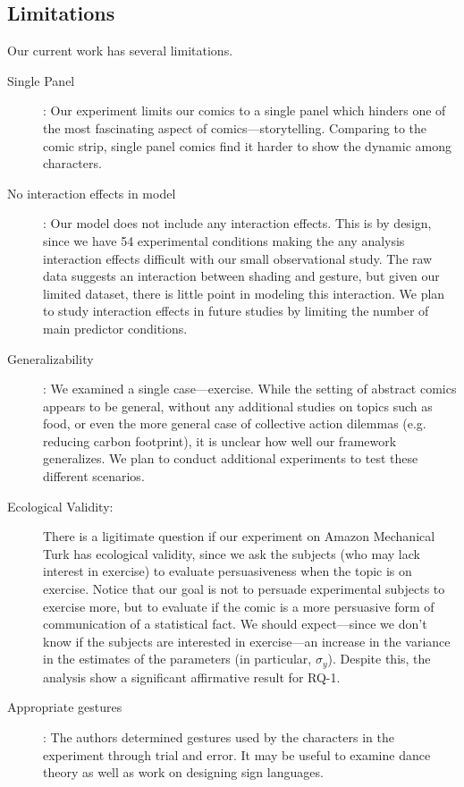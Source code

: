 \subsection{Limitations}
Our current work has several limitations.
\begin{description}
 \item[Single Panel]: Our experiment limits our comics to a single panel which hinders one of the most fascinating aspect of comics---storytelling. Comparing to the comic strip, single panel comics find it harder to show the dynamic among characters.
 \item[No interaction effects in model]: Our model does not include any interaction effects. This is by design, since we have 54 experimental conditions making the any analysis interaction effects difficult with our small observational study. The raw data suggests an interaction between shading and gesture, but given our limited dataset, there is little point in modeling this interaction. We plan to study interaction effects in future studies by limiting the number of main predictor conditions.
 \item[Generalizability]: We examined a single case---exercise. While the setting of abstract comics appears to be general, without any additional studies on topics such as food, or even the more general case of collective action dilemmas (e.g. reducing carbon footprint), it is unclear how well our framework generalizes. We plan to conduct additional experiments to test these different scenarios.
 \item[Ecological Validity:] There is a ligitimate question if our experiment on Amazon Mechanical Turk has ecological validity, since we ask the subjects (who may lack  interest in exercise) to evaluate persuasiveness when the topic is on exercise. Notice that our goal is not to persuade experimental subjects to exercise more, but to evaluate if the comic is a more persuasive form of communication of a statistical fact. We should expect---since we don't know if the subjects are interested in exercise---an increase in the variance in the estimates of the parameters (in particular,  $\sigma_y$). Despite this, the analysis show a significant affirmative result for RQ-1.
 \item[Appropriate gestures]: The authors determined gestures used by the characters in the experiment through trial and error. It may be useful to examine dance theory as well as work on designing sign languages.
\end{description}

